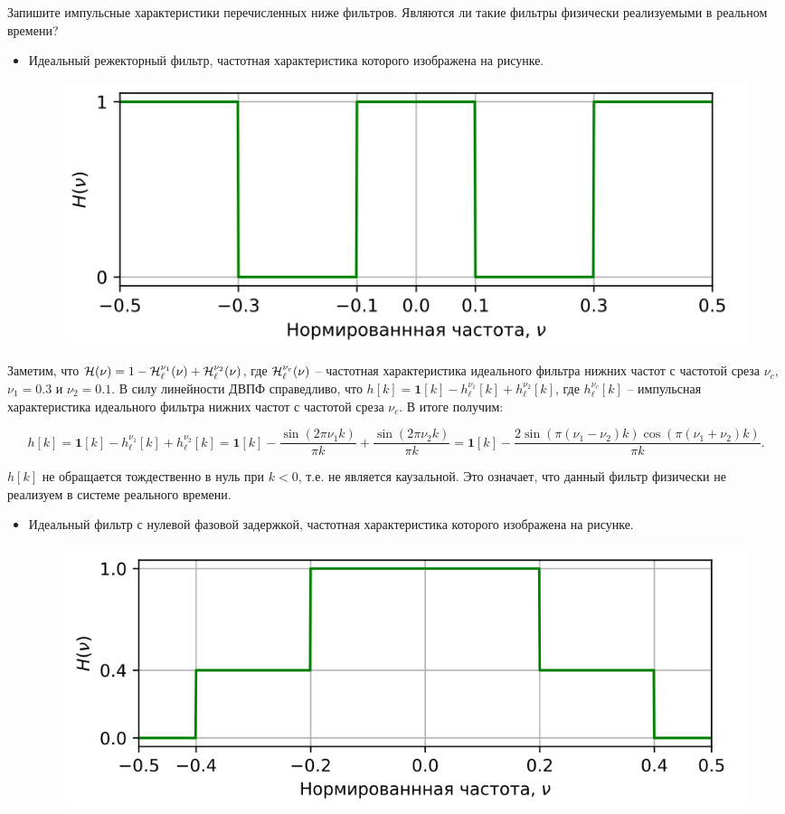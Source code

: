 \section{}
Запишите импульсные характеристики перечисленных ниже фильтров. Являются ли такие фильтры физически реализуемыми в реальном времени?

\begin{itemize}
	\item Идеальный режекторный фильтр, частотная характеристика которого изображена на рисунке.
	\begin{figure}[!h]
		\centering
		\includegraphics[width=0.6\columnwidth]{pics/fall/7/7-1.png}
		\label{fig:7-1}
		
	\end{figure}
	
\end{itemize}

Заметим, что $\mathcal{H}(\nu) = 1 - \mathcal{H}_{\ell}^{\nu_1}(\nu) + \mathcal{H}_{\ell}^{\nu_2}(\nu)$, где $\mathcal{H}_{\ell}^{\nu_c}(\nu)$ -- частотная характеристика идеального фильтра нижних частот с частотой среза $\nu_c$, $\nu_1 = 0.3$ и $\nu_2 = 0.1$. 
В силу линейности ДВПФ справедливо, что $h[k] = \mathbf{1}[k] - h_{\ell}^{\nu_1}[k] + h_{\ell}^{\nu_2}[k]$, где $h_{\ell}^{\nu_c}[k]$ -- импульсная характеристика идеального фильтра нижних частот с частотой среза $\nu_c$. В итоге получим:


\begin{equation*}
	h[k] = \mathbf{1}[k] - h_{\ell}^{\nu_1}[k] + h_{\ell}^{\nu_2}[k] =
	\mathbf{1}[k] - \dfrac{\sin(2 \pi \nu_1 k)}{\pi k} + \dfrac{\sin(2 \pi \nu_2 k)}{\pi k} = 
	\mathbf{1}[k] - \dfrac{2\sin\left(\pi(\nu_1 - \nu_2)k\right)\cos\left(\pi(\nu_1 + \nu_2)k\right)}{\pi k}.
\end{equation*}

$h[k]$ не обращается тождественно в нуль при $k<0$, т.е. не является каузальной. Это означает, что данный фильтр физически не реализуем в системе реального времени. 

\begin{itemize}
	
	\item Идеальный фильтр с нулевой фазовой задержкой, частотная характеристика которого изображена на рисунке.
	\begin{figure}[!h]
		\centering
		\includegraphics[width=0.6\columnwidth]{pics/fall/7/7-2.png}
		\label{fig:7-2}
	\end{figure}
\end{itemize}

